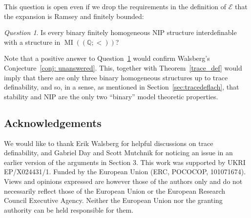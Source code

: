 \documentclass{amsart}
\theoremstyle{definition}
\theoremstyle{remark}
\newtheorem{question}[theorem]{Question}
\numberwithin{equation}{section}
\DeclareMathOperator{\MI}{\operatorname{MI}}
\newcommand{\order}{(\mathbb{Q};<)}
\begin{document}
This question is open even if we drop the requirements in the definition of ${\mathcal E}$ that the expansion is Ramsey and finitely bounded:

\begin{question}\label{quest:E2} Is every binary finitely homogeneous $\mathrm{NIP}$ structure 
interdefinable with a structure in $\MI(\order)$?
\end{question}
Note that a positive answer to Question~\ref{quest:E2} would confirm Walsberg's Conjecture~\ref{conj: unanswered}.
This, together with Theorem~\ref{trace_def} would imply that there are only three binary homogeneous structures up to trace definability, and so, in a sense, as mentioned in Section~\ref{sec:tracedeflach}, that stability and $\mathrm{NIP}$ are the only two ``binary'' model theoretic properties.




    


\subsection*{Acknowledgements}
We would like to thank Erik Walsberg for helpful discussions on trace definability, and Gabriel Day and Scott Mutchnik for noticing an issue in an earlier version of the arguments in Section 3. 
This work was supported by UKRI EP/X024431/1. Funded by the European Union (ERC, POCOCOP, 101071674). Views and opinions expressed are however those of the authors only and do not necessarily reflect those of the European Union or the European Research Council Executive Agency. Neither the European Union nor the granting authority can be held responsible for them.



 
\end{document}
